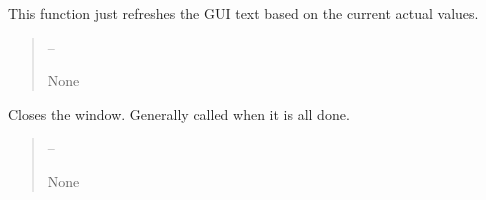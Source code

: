 \documentclass[letterpaper,11pt,english]{sphinxmanual}
\begin{document}
\begin{savenotes}
\begin{fulllineitems}

\begin{savenotes}\begin{fulllineitems}
\label{\detokenize{code/opihiexarata.gui.selector:opihiexarata.gui.selector.TargetSelectorWindow._refresh_text}}
\pysigstartsignatures
{}
\pysigstopsignatures
\sphinxAtStartPar
This function just refreshes the GUI text based on the current
actual values.
\begin{quote}\begin{description}
\sphinxAtStartPar
{} – 

\sphinxAtStartPar
None

\end{description}\end{quote}

\end{fulllineitems}\end{savenotes}


\begin{savenotes}\begin{fulllineitems}
\label{\detokenize{code/opihiexarata.gui.selector:opihiexarata.gui.selector.TargetSelectorWindow.close_window}}
\pysigstartsignatures
{}
\pysigstopsignatures
\sphinxAtStartPar
Closes the window. Generally called when it is all done.
\begin{quote}\begin{description}
\sphinxAtStartPar
{} – 

\sphinxAtStartPar
None

\end{description}\end{quote}

\end{fulllineitems}\end{savenotes}


\end{fulllineitems}
\end{savenotes}
\end{document}
